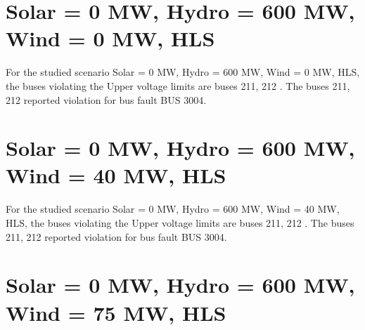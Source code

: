 \documentclass[10pt]{report}
\begin{document}
\section{Solar = 0 MW, Hydro = 600 MW, Wind = 0 MW, HLS}

For the studied scenario Solar = 0 MW, Hydro = 600 MW, Wind = 0 MW, HLS, the buses violating the Upper voltage limits are buses 211, 212 .
The buses 211, 212 reported violation for bus fault BUS 3004.
\begin{table}[H]
\caption{Contingencies reporting bus voltages greater than emergency voltage of 1.1 PU for scenario Solar = 0 MW, Hydro = 600 MW, Wind = 0 MW, HLS}
\label{HVSolar0MWHydro600MWWind0MWHLS}
\centering
{}
\end{table}

\section{Solar = 0 MW, Hydro = 600 MW, Wind = 40 MW, HLS}

For the studied scenario Solar = 0 MW, Hydro = 600 MW, Wind = 40 MW, HLS, the buses violating the Upper voltage limits are buses 211, 212 .
The buses 211, 212 reported violation for bus fault BUS 3004.
\begin{table}[H]
\caption{Contingencies reporting bus voltages greater than emergency voltage of 1.1 PU for scenario Solar = 0 MW, Hydro = 600 MW, Wind = 40 MW, HLS}
\label{HVSolar0MWHydro600MWWind40MWHLS}
\centering
{}
\end{table}

\section{Solar = 0 MW, Hydro = 600 MW, Wind = 75 MW, HLS}
\end{document}
